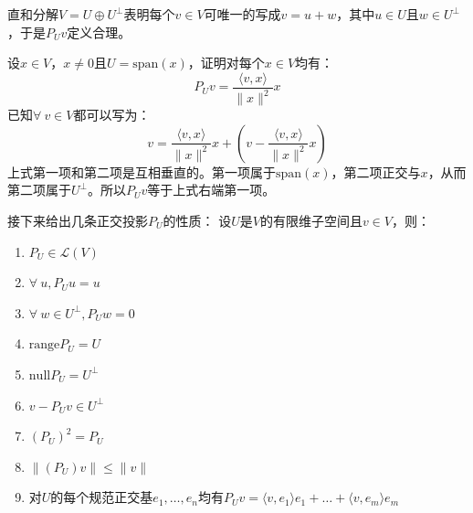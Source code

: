 \documentclass[10pt,a4paper,UTF8]{article}
\begin{document}
直和分解\(V =  U \oplus U^{\perp}\)表明每个\(v\in V\)可唯一的写成\(v = u + w\)，其中\(u\in U\)且\(w\in U^{\perp}\)，于是\(P_{U}v\)定义合理。

\begin{instance}
设\(x\in V\)，\(x\neq 0\)且\(U = \mathrm{span}(x)\)，证明对每个\(x\in V\)均有：
\begin{equation}
\label{eq:4}
P_{U}v = \frac{ \langle v,x \rangle  }{ \| x \|^{2} } x
\end{equation}
已知\(\forall~v\in V\)都可以写为：
\begin{equation}
\label{eq:5}
v= \frac{ \langle v,x \rangle  }{ \| x \|^{2} } x  + (v - \frac{ \langle v,x \rangle  }{ \| x \|^{2} } x)
\end{equation}
上式第一项和第二项是互相垂直的。第一项属于\(\mathrm{span}(x)\)，第二项正交与\(x\)，从而第二项属于\(U^{\perp}\)。所以\(P_{U}v\)等于上式右端第一项。
\end{instance}
接下来给出几条正交投影\(P_{U}\)的性质：
设\(U\)是\(V\)的有限维子空间且\(v\in V\)，则：
\begin{enumerate}
\item \(P_{U}\in \mathcal{L}(V)\)
\item \(\forall ~u, P_{U}u = u\)
\item \(\forall ~w\in U^{\perp},P_{U}w = 0\)
\item \(\mathrm{range} P_{U} = U\)
\item \(\mathrm{null}P_{U} = U^{\perp}\)
\item \(v-P_{U}v \in U^{\perp}\)
\item \((P_{U})^{2} = P_{U}\)
\item \(\| (P_{U})v  \|  \leq \| v \|\)
\item 对\(U\)的每个规范正交基\(e_{1},\ldots ,e_{n}\)均有\(P_{U}v = \langle v,e_{1} \rangle e_{1} + \ldots + \langle v,e_{m} \rangle e_{m}\)
\end{enumerate}
\end{document}
